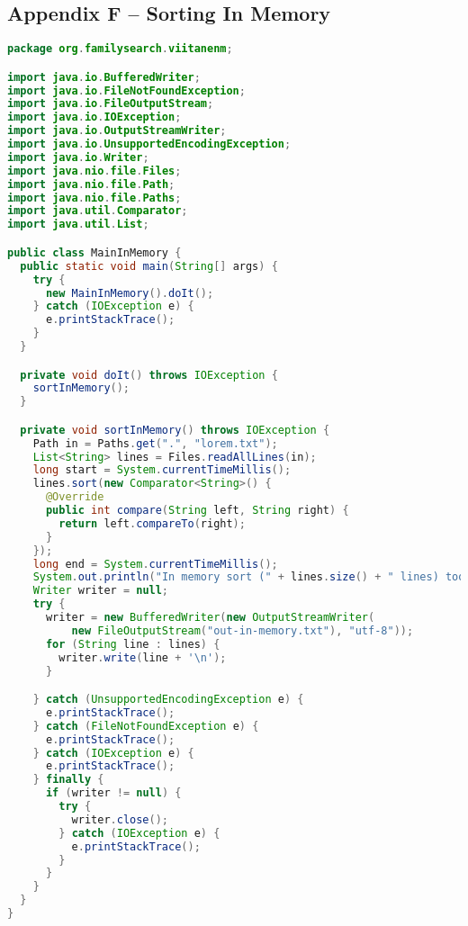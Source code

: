 \subsection*{Appendix F -- Sorting In Memory} \label{App:AppendixF}
\begin{lstlisting}[language=Java]
package org.familysearch.viitanenm;

import java.io.BufferedWriter;
import java.io.FileNotFoundException;
import java.io.FileOutputStream;
import java.io.IOException;
import java.io.OutputStreamWriter;
import java.io.UnsupportedEncodingException;
import java.io.Writer;
import java.nio.file.Files;
import java.nio.file.Path;
import java.nio.file.Paths;
import java.util.Comparator;
import java.util.List;

public class MainInMemory {
  public static void main(String[] args) {
    try {
      new MainInMemory().doIt();
    } catch (IOException e) {
      e.printStackTrace();
    }
  }

  private void doIt() throws IOException {
    sortInMemory();
  }

  private void sortInMemory() throws IOException {
    Path in = Paths.get(".", "lorem.txt");
    List<String> lines = Files.readAllLines(in);
    long start = System.currentTimeMillis();
    lines.sort(new Comparator<String>() {
      @Override
      public int compare(String left, String right) {
        return left.compareTo(right);
      }
    });
    long end = System.currentTimeMillis();
    System.out.println("In memory sort (" + lines.size() + " lines) took " + (end - start) + " ms");
    Writer writer = null;
    try {
      writer = new BufferedWriter(new OutputStreamWriter(
          new FileOutputStream("out-in-memory.txt"), "utf-8"));
      for (String line : lines) {
        writer.write(line + '\n');
      }

    } catch (UnsupportedEncodingException e) {
      e.printStackTrace();
    } catch (FileNotFoundException e) {
      e.printStackTrace();
    } catch (IOException e) {
      e.printStackTrace();
    } finally {
      if (writer != null) {
        try {
          writer.close();
        } catch (IOException e) {
          e.printStackTrace();
        }
      }
    }
  }
}
\end{lstlisting}